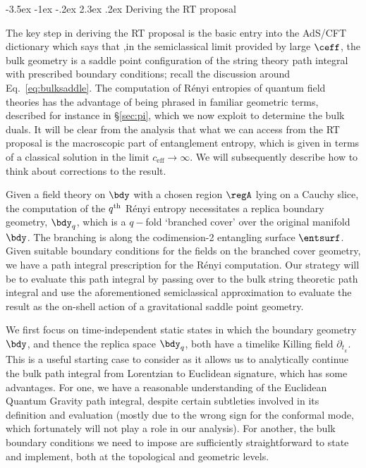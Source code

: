 \documentclass[12pt,openany]{book}
\makeatletter
\renewcommand\section{\@startsection {section}{1}{\z@}%
                                   {-3.5ex \@plus -1ex \@minus -.2ex}%
                                   {2.3ex \@plus.2ex}%
                                   {\normalfont\large\bfseries}}
\makeatother
\begin{document}
\section{Deriving the RT proposal}
\label{sec:rtderive}

The key step in deriving the RT proposal is the basic entry into the AdS/CFT dictionary which says that ,in the semiclassical limit provided by large $\ceff$, the bulk geometry is a saddle point configuration of the string theory path integral with prescribed boundary conditions; recall the discussion around Eq.~\eqref{eq:bulksaddle}.
The computation of R\'enyi entropies of quantum field theories has the advantage of being phrased in familiar geometric terms, described for instance in \S\ref{sec:pi}, which we now exploit to determine the bulk duals. It will be clear from the analysis that what we can access from the RT proposal is the macroscopic part of entanglement entropy, which is given in terms of a classical solution in the limit $c_\text{eff} \to \infty$. We will subsequently describe how to think about corrections to the result.

 Given a field theory on $\bdy$ with a chosen region $\regA$ lying on a Cauchy slice, the computation of the $q^{\rm th}$ R\'enyi entropy necessitates a replica boundary geometry,  $\bdy_q$, which is a $q-$fold `branched cover' over the original manifold $\bdy$. The branching is along the codimension-2 entangling surface $\entsurf$.  Given suitable boundary conditions for the fields on the branched cover geometry, we have a path integral prescription for the R\'enyi computation. Our strategy will be to evaluate this path integral by passing over to the bulk string theoretic path integral and use the aforementioned semiclassical approximation to evaluate the result as the on-shell action of a  gravitational saddle point geometry.

We first focus on time-independent static states in which the boundary geometry $\bdy$, and thence the replica space $\bdy_q$, both have a timelike Killing field $\partial_{t_{_E}}$. This is a useful starting case to consider as it allows us to analytically continue the bulk path integral from Lorentzian to Euclidean signature, which has some advantages. For one, we have a reasonable understanding of the Euclidean Quantum Gravity path integral, despite certain subtleties involved in its definition and evaluation (mostly due to the wrong sign for the conformal mode, which fortunately will not play a role in our analysis). For another, the bulk boundary conditions we need to impose are sufficiently straightforward to state and implement, both at the topological and geometric levels.
\end{document}
